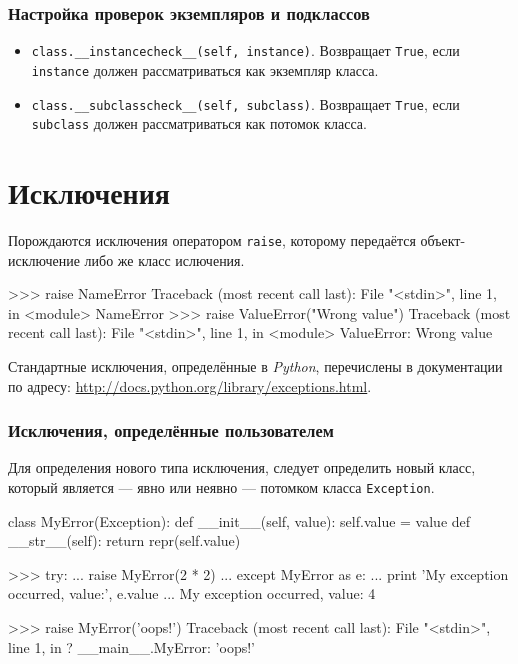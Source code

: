 \subsubsection{Настройка проверок экземпляров и подклассов}
\begin{itemize}
  \item \lstinline{class.__instancecheck__(self, instance)}. Возвращает \lstinline{True}, если \lstinline{instance} должен рассматриваться как экземпляр класса.
  \item \lstinline{class.__subclasscheck__(self, subclass)}. Возвращает \lstinline{True}, если \lstinline{subclass} должен рассматриваться как потомок класса.
\end{itemize}

\section{Исключения}
\label{sec:py-exceptions}

Порождаются исключения оператором \lstinline{raise}, которому передаётся объект-исключение либо же класс ислючения.
\begin{pylst}{}{}
>>> raise NameError
Traceback (most recent call last):
  File "<stdin>", line 1, in <module>
NameError
>>> raise ValueError("Wrong value")
Traceback (most recent call last):
  File "<stdin>", line 1, in <module>
ValueError: Wrong value
\end{pylst}

Стандартные исключения, определённые в \emph{Python}, перечислены в документации по адресу: \url{http://docs.python.org/library/exceptions.html}.

\subsubsection{Исключения, определённые пользователем}
Для определения нового типа исключения, следует определить новый класс, который является — явно или неявно — потомком класса \lstinline{Exception}.
\begin{pylst}{}{}
class MyError(Exception):
    def __init__(self, value):
        self.value = value
    def __str__(self):
        return repr(self.value)

>>> try:
...     raise MyError(2 * 2)
... except MyError as e:
...     print 'My exception occurred, value:', e.value
...
My exception occurred, value: 4

>>> raise MyError('oops!')
Traceback (most recent call last):
  File "<stdin>", line 1, in ?
__main__.MyError: 'oops!'
\end{pylst}

